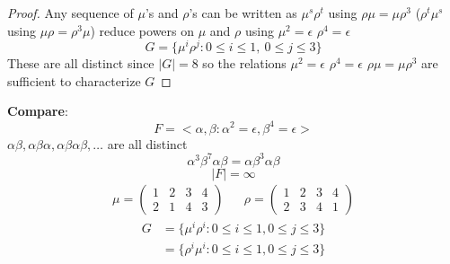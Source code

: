 \documentclass[openany]{report}
\begin{document}
\begin{proof}
    Any sequence of $\mu$'s and $\rho$'s can be written as $\mu^s\rho^t$ using $\rho\mu = \mu\rho^3$ ($\rho^t\mu^s$ using $\mu\rho = \rho^3\mu$) reduce powers on $\mu$ and $\rho$ using $\mu^2 = \epsilon$ $\rho^4 = \epsilon$
    $$G = \{\mu^i\rho^j: 0 \leq i \leq 1, \ 0 \leq j \leq 3\}$$
    These are all distinct since $|G| = 8$ so the relations $\mu^2 = \epsilon$ $\rho^4 = \epsilon$ $\rho\mu = \mu\rho^3$ are sufficient to characterize $G$
\end{proof}
\textbf{Compare}:
$$F = <\alpha, \beta : \alpha^2 = \epsilon, \beta^4 = \epsilon>$$
$\alpha\beta,\alpha\beta\alpha,\alpha\beta\alpha\beta, \dots$ are all distinct
$$\alpha^3\beta^7\alpha\beta = \alpha\beta^3\alpha\beta$$
$$|F| = \infty$$
\drawsquare
\begin{align*}
    \mu = \begin{pmatrix}
    1 & 2 & 3 & 4\\
    2 & 1 & 4 & 3
\end{pmatrix} &&\rho = \begin{pmatrix}
    1 & 2 & 3 & 4\\
    2 & 3 & 4 & 1
\end{pmatrix}
\end{align*}
\begin{align*}
    G &= \{\mu^i\rho^i: 0\leq i \leq 1, 0 \leq j \leq 3\}\\
    &= \{\rho^i\mu^i: 0\leq i \leq 1, 0 \leq j \leq 3\}
\end{align*}
\end{document}
